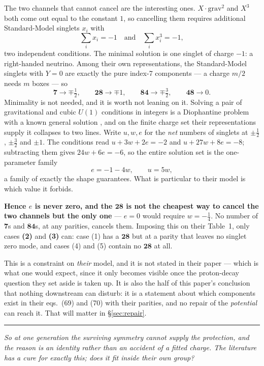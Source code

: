 \documentclass[11pt,a4paper]{article}
\newcommand{\rep}[1]{\mathbf{#1}}
\newcommand{\bridge}[1]{\par\medskip\noindent
  \textcolor{hdrblue!45}{\rule{2.2cm}{0.6pt}}\;\;\parbox[t]{0.84\textwidth}{\small\itshape
  \textcolor{hdrblue!85}{#1}}\par\medskip}
\newenvironment{keyeq}
  {\begin{center}\setlength{\fboxsep}{9pt}\setlength{\fboxrule}{0.8pt}%
   \begin{lrbox}{\keyeqbox}\begin{minipage}{0.88\textwidth}}
  {\end{minipage}\end{lrbox}%
   \fcolorbox{hdrblue!55}{hdrblue!6}{\usebox{\keyeqbox}}\end{center}}
\begin{document}
The two channels that cannot cancel are the interesting ones. $X\cdot\mathrm{grav}^2$ and $X^3$
both come out equal to the constant $1$, so cancelling them requires additional
Standard-Model singlets $x_i$ with
\[
\textstyle\sum_i x_i=-1\quad\text{and}\quad\sum_i x_i^3=-1,
\]
two independent conditions. The minimal solution is one singlet of charge $-1$: a right-handed
neutrino. Among their own representations, the Standard-Model singlets with $Y=0$ are exactly the
pure index-7 components --- a charge $m/2$ needs $m$ boxes --- so
\[
\rep7\to\mp\tfrac12,\qquad \rep{28}\to\mp1,\qquad \rep{84}\to\mp\tfrac32,\qquad \rep{48}\to 0 .
\]
Minimality is not needed, and it is worth not leaning on it. Solving a pair of gravitational and
cubic $U(1)$ conditions in integers is a Diophantine problem with a known general
solution \cite{CDF}, and on the finite charge set their representations supply it collapses to two
lines. Write $u,w,e$ for the \emph{net} numbers of singlets at $\pm\tfrac12$, $\pm\tfrac32$ and
$\pm1$. The conditions read $u+3w+2e=-2$ and $u+27w+8e=-8$; subtracting them gives $24w+6e=-6$, so
the entire solution set is the one-parameter family
\[
e=-1-4w,\qquad u=5w ,
\]
a family of exactly the shape \cite{CDF} guarantees. What is particular to their model is which
value it forbids.

\begin{keyeq}
\textbf{Hence $e$ is never zero, and the $\rep{28}$ is not the cheapest way to cancel the two
channels but the only one} --- $e=0$ would require $w=-\tfrac14$. No number of $\rep7$s and
$\rep{84}$s, at any parities, cancels them. Imposing this on their Table~1, only cases \textbf{(2)}
and \textbf{(3)} can: case (1) has a $\rep{28}$ but at a parity that leaves no singlet zero mode, and
cases (4) and (5) contain no $\rep{28}$ at all.
\end{keyeq}

This is a constraint on \emph{their} model, and it is not stated in their paper --- which is what one
would expect, since it only becomes visible once the proton-decay question they set aside is taken up.
It is also the half of this paper's conclusion that nothing downstream can disturb: it is a statement
about which components exist in their eqs.~(69) and (70) with their parities, and no repair of the
\emph{potential} can reach it. That will matter in \S\ref{sec:repair}.

\bridge{So at one generation the surviving symmetry cannot supply the protection, and the reason is
an identity rather than an accident of a fitted charge. The literature has a cure for exactly this;
does it fit inside their own group?}
\end{document}
